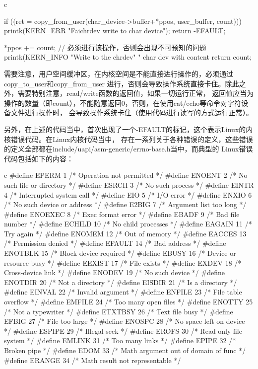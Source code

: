 \begin{code-block}{c}
{        if ((ret = copy_from_user(char_device->buffer+*ppos,
                                user_buffer, count))) {
                printk(KERN_ERR "Faichrdev write to char device\n");
                return -EFAULT;
        }

        *ppos += count; // 必须进行该操作，否则会出现不可预知的问题
        printk(KERN_INFO "Write to the chrdev"
                " char dev with content %
        return count;
}
\end{code-block}

需要注意，用户空间缓冲区，在内核空间是不能直接进行操作的，必须通过copy\_to\_user和copy\_from\_user
进行，否则会导致操作系统直接卡住。除此之外，需要特别注意，read/write函数的返回值，如果一切运行正常，
返回值应当为操作的数量（即count），不能随意返回0，否则，在使用cat/echo等命令对字符设备文件进行操作时，
会导致操作系统卡住（使用代码进行读写的方式运行正常）。

另外，在上述的代码当中，首次出现了一个-EFAULT的标记，这个表示Linux的内核错误代码。在Linux内核代码当中，
存在一系列关于各种错误的定义，这些错误的定义全部都在include/uapi/asm-generic/errno-base.h当中，而典型的
Linux错误代码包括如下的内容：
\begin{code-block}{c}
#define EPERM   1  /* Operation not permitted */
#define ENOENT  2  /* No such file or directory */
#define ESRCH   3  /* No such process */
#define EINTR   4  /* Interrupted system call */
#define EIO     5  /* I/O error */
#define ENXIO   6  /* No such device or address */
#define E2BIG   7  /* Argument list too long */
#define ENOEXEC 8  /* Exec format error */
#define EBADF   9  /* Bad file number */
#define ECHILD  10 /* No child processes */
#define EAGAIN  11 /* Try again */
#define ENOMEM  12 /* Out of memory */
#define EACCES  13 /* Permission denied */
#define EFAULT  14 /* Bad address */
#define ENOTBLK 15 /* Block device required */
#define EBUSY   16 /* Device or resource busy */
#define EEXIST  17 /* File exists */
#define EXDEV   18 /* Cross-device link */
#define ENODEV  19 /* No such device */
#define ENOTDIR 20 /* Not a directory */
#define EISDIR  21 /* Is a directory */
#define EINVAL  22 /* Invalid argument */
#define ENFILE  23 /* File table overflow */
#define EMFILE  24 /* Too many open files */
#define ENOTTY  25 /* Not a typewriter */
#define ETXTBSY 26 /* Text file busy */
#define EFBIG   27 /* File too large */
#define ENOSPC  28 /* No space left on device */
#define ESPIPE  29 /* Illegal seek */
#define EROFS   30 /* Read-only file system */
#define EMLINK  31 /* Too many links */
#define EPIPE   32 /* Broken pipe */
#define EDOM    33 /* Math argument out of domain of func */
#define ERANGE  34 /* Math result not representable */
\end{code-block}

